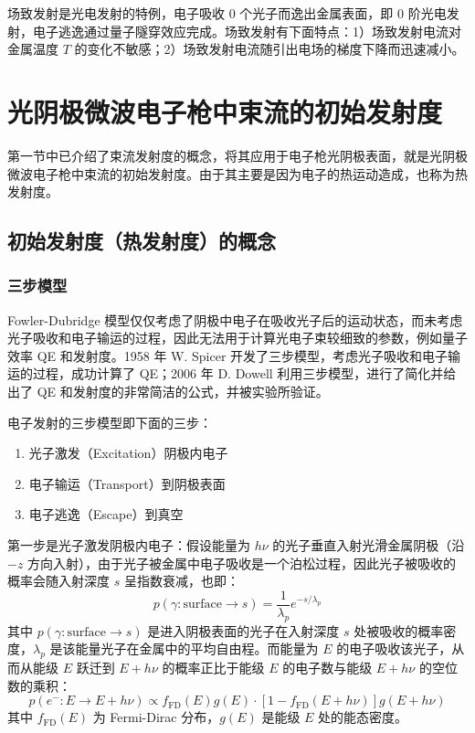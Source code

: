 场致发射是光电发射的特例，电子吸收 0 个光子而逸出金属表面，即 0 阶光电发射，电子逃逸通过量子隧穿效应完成。场致发射有下面特点：1）场致发射电流对金属温度 $T$ 的变化不敏感；2）场致发射电流随引出电场的梯度下降而迅速减小。

\section{光阴极微波电子枪中束流的初始发射度}
第一节中已介绍了束流发射度的概念，将其应用于电子枪光阴极表面，就是光阴极微波电子枪中束流的初始发射度。由于其主要是因为电子的热运动造成，也称为热发射度。

\subsection{初始发射度（热发射度）的概念}
\subsubsection{三步模型}
Fowler-Dubridge 模型仅仅考虑了阴极中电子在吸收光子后的运动状态，而未考虑光子吸收和电子输运的过程，因此无法用于计算光电子束较细致的参数，例如量子效率 QE 和发射度。1958 年 W. Spicer 开发了三步模型，考虑光子吸收和电子输运的过程，成功计算了 QE；2006 年 D. Dowell 利用三步模型，进行了简化并给出了 QE 和发射度的非常简洁的公式，并被实验所验证。

电子发射的三步模型即下面的三步：
	\begin{enumerate}
	\item 光子激发（Excitation）阴极内电子
	\item 电子输运（Transport）到阴极表面
	\item 电子逃逸（Escape）到真空
	\end{enumerate}
	
第一步是光子激发阴极内电子：假设能量为 $h\nu$ 的光子垂直入射光滑金属阴极（沿 $-z$ 方向入射），由于光子被金属中电子吸收是一个泊松过程，因此光子被吸收的概率会随入射深度 $s$ 呈指数衰减，也即：
	\[
	p(\gamma: \mathrm{surface} \to s) = \frac{1}{\lambda_p}e^{-s/\lambda_p}
	\]
	其中 $p(\gamma: \mathrm{surface} \to s)$ 是进入阴极表面的光子在入射深度 $s$ 处被吸收的概率密度，$\lambda_p$ 是该能量光子在金属中的平均自由程。而能量为 $E$ 的电子吸收该光子，从而从能级 $E$ 跃迁到 $E+h\nu$ 的概率正比于能级 $E$ 的电子数与能级 $E+h\nu$ 的空位数的乘积：
	\[
	p(e^{-}: E\to E+h\nu) \propto f_{\mathrm{FD}}(E)g(E)\cdot [1-f_{\mathrm{FD}}(E+h\nu)]g(E+h\nu)
	\]
	其中 $f_{\mathrm{FD}}(E)$ 为 Fermi-Dirac 分布，$g(E)$ 是能级 $E$ 处的能态密度。
	
